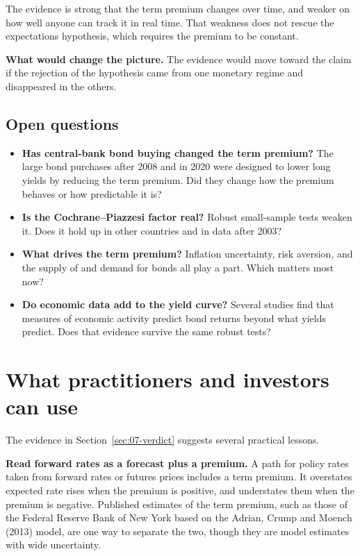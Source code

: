 The evidence is strong that the term premium changes over time, and weaker on how well anyone can track it in real time. That weakness does not rescue the expectations hypothesis, which requires the premium to be constant.

\textbf{What would change the picture.} The evidence would move toward the claim if the rejection of the hypothesis came from one monetary regime and disappeared in the others.

\subsection{Open questions}
\label{sec:07-open}

\begin{itemize}
  \item \textbf{Has central-bank bond buying changed the term premium?} The large bond purchases after 2008 and in 2020 were designed to lower long yields by reducing the term premium. Did they change how the premium behaves or how predictable it is?
  \item \textbf{Is the Cochrane--Piazzesi factor real?} Robust small-sample tests weaken it. Does it hold up in other countries and in data after 2003?
  \item \textbf{What drives the term premium?} Inflation uncertainty, risk aversion, and the supply of and demand for bonds all play a part. Which matters most now?
  \item \textbf{Do economic data add to the yield curve?} Several studies find that measures of economic activity predict bond returns beyond what yields predict. Does that evidence survive the same robust tests?
\end{itemize}

\section{What practitioners and investors can use}
\label{sec:07-investors}

The evidence in Section~\ref{sec:07-verdict} suggests several practical lessons.

\textbf{Read forward rates as a forecast plus a premium.} A path for policy rates taken from forward rates or futures prices includes a term premium. It overstates expected rate rises when the premium is positive, and understates them when the premium is negative. Published estimates of the term premium, such as those of the Federal Reserve Bank of New York based on the Adrian, Crump and Moench (2013) model, are one way to separate the two, though they are model estimates with wide uncertainty.


